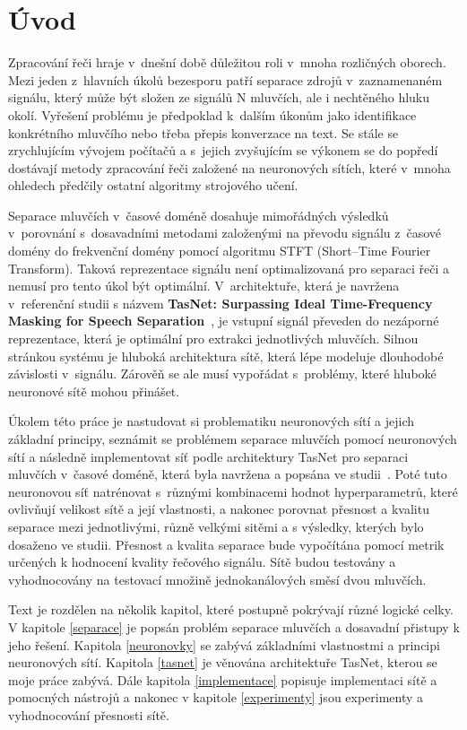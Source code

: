 \chapter{Úvod}
Zpracování řeči hraje v~dnešní době důležitou roli v~mnoha rozličných oborech. Mezi jeden z~hlavních úkolů bezesporu patří separace zdrojů v~zaznamenaném signálu, který může být složen ze signálů N mluvčích, ale i nechtěného hluku okolí. Vyřešení problému je předpoklad k~dalším úkonům jako identifikace konkrétního mluvčího nebo třeba přepis konverzace na text. Se stále se zrychlujícím vývojem počítačů a s~jejich zvyšujícím se výkonem se do popředí dostávají metody zpracování řeči založené na neuronových sítích, které v~mnoha ohledech předčily ostatní algoritmy strojového učení.

Separace mluvčích v~časové doméně dosahuje mimořádných výsledků v~porovnání s~dosavadními metodami  založenými na převodu signálu z~časové domény do frekvenční domény pomocí algoritmu STFT (Short--Time Fourier Transform). Taková reprezentace signálu není optimalizovaná pro separaci řeči a nemusí pro tento úkol být optimální. V~architektuře, která je navržena v~referenční studii s názvem \textbf{TasNet: Surpassing Ideal Time-Frequency Masking for Speech Separation}~\cite{luo2018convtasnet}, je vstupní signál převeden do nezáporné reprezentace, která je optimální pro extrakci jednotlivých mluvčích. Silnou stránkou systému je hluboká architektura sítě, která lépe modeluje dlouhodobé závislosti v~signálu. Zárověň se ale musí vypořádat s~problémy, které hluboké neuronové sítě mohou přinášet.

Úkolem této práce je nastudovat si problematiku neuronových sítí a jejich základní principy, seznámit se problémem separace mluvčích pomocí neuronových sítí a následně implementovat síť podle architektury TasNet pro separaci mluvčích v~časové doméně, která byla navržena a popsána ve studii~\cite{luo2018convtasnet}. Poté tuto neuronovou síť natrénovat s~různými kombinacemi hodnot hyperparametrů, které ovlivňují velikost sítě a její vlastnosti, a nakonec porovnat přesnost a kvalitu separace mezi jednotlivými, různě velkými sitěmi a s výsledky, kterých bylo dosaženo ve studii. Přesnost a kvalita separace bude vypočítána pomocí metrik určených k hodnocení kvality řečového signálu. Sítě budou testovány a vyhodnocovány na testovací množině jednokanálových směsí dvou mluvčích.

Text je rozdělen na několik kapitol, které postupně pokrývají různé logické celky. V kapitole \ref{separace} je popsán problém separace mluvčích a dosavadní přistupy k jeho řešení. Kapitola \ref{neuronovky} se zabývá základními vlastnostmi a principi neuronových sítí. Kapitola \ref{tasnet} je věnována architektuře TasNet, kterou se moje práce zabývá. Dále kapitola \ref{implementace} popisuje implementaci sítě a pomocných nástrojů a nakonec v kapitole \ref{experimenty} jsou experimenty a vyhodnocování přesnosti sítě.



